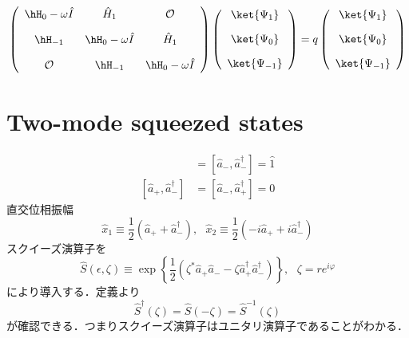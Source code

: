 \begin{align}
    \left(
    \begin{array}{ccc}
    \hH_0-\omega\hat{I} & \hat{H}_1& \mathcal{O}\\[10pt]
    \hH_{-1} & \hH_0-\omega\hat{I} & \hat{H}_1 \\[10pt]
     \mathcal{O}  & \hH_{-1} & \hH_0-\omega\hat{I}
    \end{array}
    \right)
    \left(
    \begin{array}{c}
    \ket{\Psi_1} \\[10pt]
    \ket{\Psi_0} \\[10pt]
    \ket{\Psi_{-1}}
    \end{array}
    \right)
    =
    q
    \left(
    \begin{array}{c}
    \ket{\Psi_1} \\[10pt]
    \ket{\Psi_0} \\[10pt]
    \ket{\Psi_{-1}}
    \end{array}
    \right)
\end{align}




\section{Two-mode squeezed states}
\begin{align}
    [\hat{a}_{+}, \hat{a}_{+}^{\dagger}]&=[\hat{a}_{-}, \hat{a}_{-}^{\dagger}]=\hat{1}\\[10pt]
    [\hat{a}_{+}, \hat{a}_{-}^{\dagger}]&=[\hat{a}_{-}, \hat{a}_{+}^{\dagger}]=0
\end{align}
直交位相振幅
\begin{equation}
    \hat{x}_1 \equiv \frac{1}{2}(\hat{a}_{+} + \hat{a}_{-}^\dagger),\ \ \ 
    \hat{x}_2 \equiv \frac{1}{2}(-i\hat{a}_{+} + i\hat{a}_{-}^\dagger)
\end{equation}
スクイーズ演算子を
\begin{equation}
    \hat{S}(\epsilon, \zeta)\equiv
    \exp{
    \left\{
    \frac{1}{2}(\zeta^\ast\hat{a}_{+}\hat{a}_{-}-\zeta\hat{a}_{+}^{\dagger}\hat{a}_{-}^{\dagger})
    \right\}
    },\ \ \ \zeta = re^{i\varphi}
\end{equation}
により導入する．定義より
\begin{equation}
    \hat{S}^\dagger(\zeta)=\hat{S}(-\zeta)=\hat{S}^{-1}(\zeta)
\end{equation}
が確認できる．つまりスクイーズ演算子はユニタリ演算子であることがわかる．

